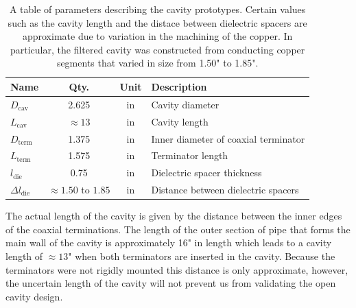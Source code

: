\begin{table}[htbp]
    \centering
    \caption{\label{tab:chap6-cavity-prototype-params} A table of parameters describing the cavity prototypes. Certain values such as the cavity length and the distace between dielectric spacers are approximate due to variation in the machining of the copper. In particular, the filtered cavity was constructed from conducting copper segments that varied in size from 1.50" to 1.85".}
    \begin{tabular}{l|c|c|l}
        \hline
        Name & Qty. & Unit & Description \\
        \hline
        $D_\mathrm{cav}$ & 2.625 & in & Cavity diameter\\
        $L_\mathrm{cav}$ & $\approx 13$ & in & Cavity length\\
        $D_\mathrm{term}$ & 1.375 & in & Inner diameter of coaxial terminator\\
        $L_\mathrm{term}$ & 1.575 & in & Terminator length\\
        \hline
        $l_\mathrm{die}$ & 0.75 & in & Dielectric spacer thickness\\
        $\Delta l_\mathrm{die}$ & $\approx 1.50$ to $1.85$ & in & Distance between dielectric spacers\\
        \hline
    \end{tabular}
\end{table}

The actual length of the cavity is given by the distance between the inner edges of the coaxial terminations. The length of the outer section of pipe that forms the main wall of the cavity is approximately 16" in length which leads to a cavity length of $\approx 13$" when both terminators are inserted in the cavity. Because the terminators were not rigidly mounted this distance is only approximate, however, the uncertain length of the cavity will not prevent us from validating the open cavity design.

